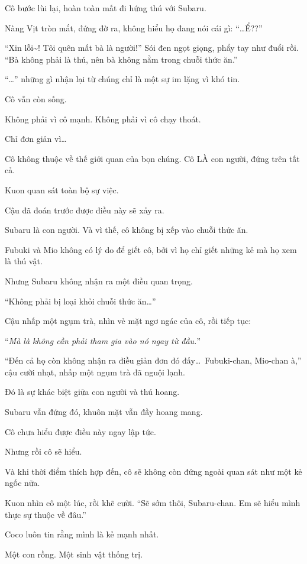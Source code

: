 \documentclass[../main.tex]{subfiles}
\begin{document}
Cô bước lùi lại, hoàn toàn mất đi hứng thú với Subaru.

Nàng Vịt tròn mắt, đứng đờ ra, không hiểu họ đang nói cái gì: ``\dots Ể??''

``Xin lỗi\~{}! Tôi quên mất bà là người!'' Sói đen ngọt giọng, phẩy tay như đuổi rồi. ``Bà không phải là  thú, nên bà không nằm trong chuỗi thức ăn.''

``\dots'' những gì nhận lại từ chúng chỉ là một sự im lặng vì khó tin.

Cô vẫn còn sống.

Không phải vì cô mạnh. Không phải vì cô chạy thoát.

Chỉ đơn giản vì\dots

Cô không thuộc về thế giới quan của bọn chúng. Cô LÀ con người, đứng trên tất cả.

\il

Kuon quan sát toàn bộ sự việc.

Cậu đã đoán trước được điều này sẽ xảy ra.

Subaru là con người. Và vì thế, cô không bị xếp vào chuỗi thức ăn.

Fubuki và Mio không có lý do để giết cô, bởi vì họ chỉ giết những kẻ mà họ xem là thú vật.

Nhưng Subaru không nhận ra một điều quan trọng.

``Không phải bị loại khỏi chuỗi thức ăn\dots''

Cậu nhấp một ngụm trà, nhìn vẻ mặt ngơ ngác của cô, rồi tiếp tục:

``\emph{Mà là không cần phải tham gia vào nó ngay từ đầu.}''

``Đến cả họ còn không nhận ra điều giản đơn đó đấy\dots\ Fubuki-chan, Mio-chan à,'' cậu cười nhạt, nhấp một ngụm trà đã nguội lạnh.

Đó là sự khác biệt giữa con người và thú hoang.

Subaru vẫn đứng đó, khuôn mặt vẫn đầy hoang mang.

Cô chưa hiểu được điều này ngay lập tức.

Nhưng rồi cô sẽ hiểu.

Và khi thời điểm thích hợp đến, cô sẽ không còn đứng ngoài quan sát như một kẻ ngốc nữa.

Kuon nhìn cô một lúc, rồi khẽ cười. ``Sẽ sớm thôi, Subaru-chan. Em sẽ hiểu mình thực sự thuộc về đâu.''

\ct

Coco luôn tin rằng mình là kẻ mạnh nhất.

Một con rồng. Một sinh vật thống trị.
\end{document}

